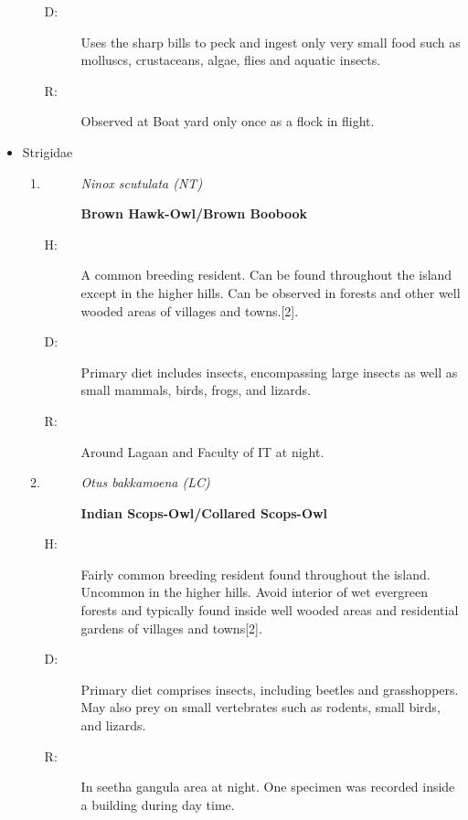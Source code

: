 \begin{itemize}
\begin{enumerate}
\begin{description}
\item[D: ]%
Uses the sharp bills to peck and ingest only very small food such as molluscs, crustaceans, algae, flies and aquatic insects.%
\item[R: ]%
Observed at Boat yard only once as a flock in flight.%
\end{description}%
\end{enumerate}%
\item%
Strigidae%
\begin{enumerate}%
\item%
\begin{description}%
\item[]%
\textit{Ninox scutulata (NT)}%
\item[]%
\textbf{Brown Hawk{-}Owl/Brown Boobook}%
\end{description}%
\begin{description}%
\item[H: ]%
A common breeding resident. Can be found throughout the island except in the higher hills. Can be observed in forests and other well wooded areas of villages and towns.{[}2{]}.%
\item[D: ]%
Primary diet includes insects, encompassing large insects as well as small mammals, birds, frogs, and lizards.%
\item[R: ]%
Around Lagaan and Faculty of IT at night.%
\end{description}%
\item%
\begin{description}%
\item[]%
\textit{Otus bakkamoena (LC)}%
\item[]%
\textbf{Indian Scops{-}Owl/Collared Scops{-}Owl}%
\end{description}%
\begin{description}%
\item[H: ]%
Fairly common breeding resident found throughout the island. Uncommon in the higher hills. Avoid interior of wet evergreen forests and typically found inside well wooded areas and residential gardens of villages and towns{[}2{]}.%
\item[D: ]%
Primary diet comprises insects, including beetles and grasshoppers. May also prey on small vertebrates such as rodents, small birds, and lizards.%
\item[R: ]%
In seetha gangula area at night. One specimen was recorded inside a building during day time.%
\end{description}%
\end{enumerate}%

\end{itemize}
